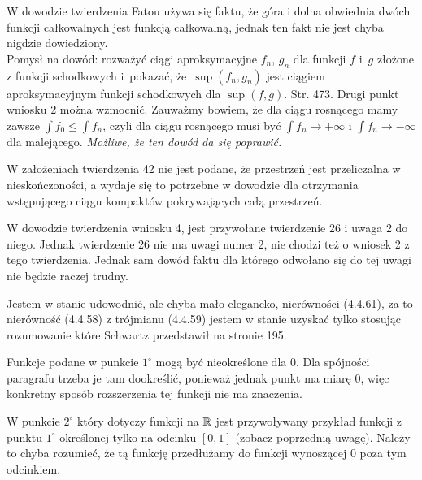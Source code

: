 \documentclass[a4paper,11pt]{article}
\begin{document}
\vspace{\spaceFour}


\start {} W dowodzie twierdzenia Fatou używa się faktu, że góra
i dolna obwiednia dwóch funkcji całkowalnych jest funkcją
całkowalną, jednak ten fakt nie jest chyba nigdzie dowiedziony. \\
Pomysł na dowód: rozważyć ciągi aproksymacyjne $f_{ n }$, $g_{ n }$
dla funkcji $f$ i~$g$ złożone z funkcji schodkowych i~pokazać,
że~$\sup( f_{ n }, g_{ n } )$ jest ciągiem aproksymacyjnym funkcji
schodkowych dla $\sup( f, g )$. \start Str. 473. Drugi punkt wniosku 2
można wzmocnić. Zauważmy bowiem, że dla ciągu rosnącego mamy zawsze
$\int f_{ 0 } \leq \int f_{ n }$, czyli dla ciągu rosnącego musi być
$\int f_{ n } \to +\infty$ i $\int f_{ n } \to -\infty$ dla
malejącego. \textit{Możliwe, że ten dowód da się poprawić.}

\vspace{\spaceFour}


\start {} W założeniach twierdzenia 42 nie jest podane, że
przestrzeń jest przeliczalna w nieskończoności, a wydaje się to
potrzebne w dowodzie dla otrzymania wstępującego ciągu kompaktów
pokrywających całą przestrzeń.

\vspace{\spaceFour}


\start {} W dowodzie twierdzenia wniosku 4, jest przywołane
twierdzenie 26 i uwaga 2 do niego. Jednak twierdzenie 26 nie ma uwagi
numer 2, nie chodzi też o wniosek 2 z tego twierdzenia. Jednak sam
dowód faktu dla którego odwołano się do tej uwagi nie będzie raczej
trudny.

\vspace{\spaceFour}


\start {} Jestem w stanie udowodnić, ale chyba mało elegancko,
nierówności (4.4.61), za to nierówność (4.4.58) z trójmianu (4.4.59)
jestem w stanie uzyskać tylko stosując rozumowanie które Schwartz
przedstawił na stronie 195.

\vspace{\spaceFour}


\start {} Funkcje podane w punkcie $1^{ \circ }$ mogą być
nieokreślone dla 0. Dla spójności paragrafu trzeba je tam dookreślić,
ponieważ jednak punkt ma miarę 0, więc konkretny sposób rozszerzenia
tej funkcji nie ma znaczenia.

\vspace{\spaceFour}


\start {} W punkcie $2^{ \circ }$ który dotyczy funkcji na
$\mathbb{R}$ jest przywoływany przykład funkcji z punktu $1^{ \circ }$
określonej tylko na odcinku $[ 0, 1 ]$ (zobacz poprzednią uwagę).
Należy to chyba rozumieć, że tą funkcję przedłużamy do funkcji
wynoszącej 0 poza tym odcinkiem.
\end{document}
